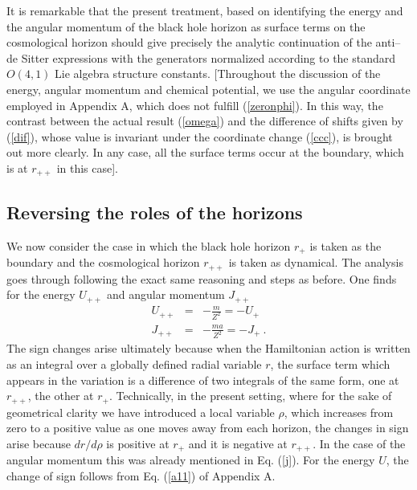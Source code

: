 \documentclass[a4paper,preprintnumbers,amsmath,amssymb]{revtex4}
\begin{document}
It is remarkable that the present treatment, based on identifying the energy and the angular momentum of the black hole horizon as surface terms on the cosmological
horizon should give precisely
the analytic continuation of the anti--de Sitter expressions with the generators normalized
according to the standard $O(4,1)$ Lie algebra structure constants.
[Throughout the discussion of the energy, angular momentum and chemical potential, we  use the angular coordinate employed in Appendix A, which does not fulfill (\ref{zeronphi}). In this way, the contrast between the actual result (\ref{omega}) and the difference of shifts given by (\ref{dif}), whose value
is invariant under the coordinate change (\ref{ccc}), is brought out more clearly. In any case, all the surface terms occur at the boundary, which is at $r_{++}$
in this case].

\subsection*{Reversing the roles of the horizons}

We now consider the case in which the black hole horizon $r_+$ is taken as the boundary
and the cosmological horizon $r_{++}$ is taken as dynamical. The analysis goes through following the exact same reasoning and steps as before. One finds for the
energy $U_{++}$ and angular
momentum $J_{++}$
\begin{eqnarray}
U_{++} &=& -\frac{m}{Z^2} = -U_+ \label{U++} \\
J_{++} &=& -\frac{ma}{Z^2} = -J_+ \label{J++} \ .
\end{eqnarray}
The sign changes arise ultimately because when the Hamiltonian action is written
as an integral over a globally defined radial variable $r$, the surface term which
appears in the variation is a difference of two integrals of the same form, one at $r_{++}$, the
other at $r_+$. Technically, in the present setting, where for the sake of
geometrical clarity we have introduced a local variable $\rho$, which increases from zero to
a positive value as one moves away from each horizon, the changes in sign arise because
$dr/d\rho$ is positive at $r_+$ and it is negative at $r_{++}$. In the case of the angular
momentum this was already mentioned in Eq. (\ref{j}). For the energy $U$, the change of sign
follows from Eq. (\ref{a11}) of Appendix A.
\end{document}
